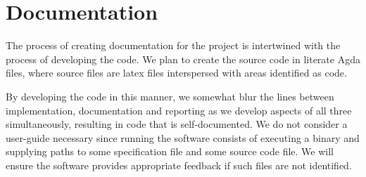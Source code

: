 \section{Documentation}

The process of creating documentation for the project is intertwined
with the process of developing the code. We plan to create the source
code in literate Agda files, where source files are latex
files interspersed with areas identified as code.

By developing the code in this manner, we somewhat blur the lines
between implementation, documentation and reporting as we develop
aspects of all three simultaneously, resulting in code that is
self-documented. We do not consider a user-guide necessary since running
the software consists of executing a binary and supplying paths to some
specification file and some source code file. We will ensure the
software provides appropriate feedback if such files are not
identified.

